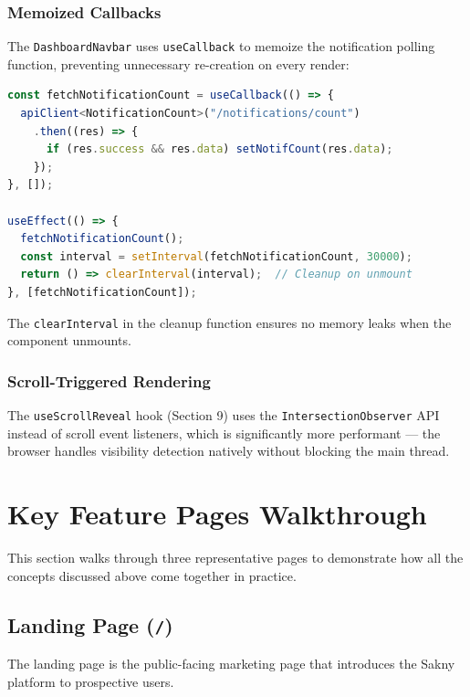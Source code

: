 \documentclass[12pt,a4paper]{article}
\begin{document}
\subsubsection{Memoized Callbacks}

The \texttt{DashboardNavbar} uses \texttt{useCallback} to memoize the notification polling function, preventing unnecessary re-creation on every render:

\begin{lstlisting}[language=TypeScript,title={Memoized polling with cleanup}]
const fetchNotificationCount = useCallback(() => {
  apiClient<NotificationCount>("/notifications/count")
    .then((res) => {
      if (res.success && res.data) setNotifCount(res.data);
    });
}, []);

useEffect(() => {
  fetchNotificationCount();
  const interval = setInterval(fetchNotificationCount, 30000);
  return () => clearInterval(interval);  // Cleanup on unmount
}, [fetchNotificationCount]);
\end{lstlisting}

The \texttt{clearInterval} in the cleanup function ensures no memory leaks when the component unmounts.

\subsubsection{Scroll-Triggered Rendering}

The \texttt{useScrollReveal} hook (Section 9) uses the \texttt{IntersectionObserver} API instead of scroll event listeners, which is significantly more performant — the browser handles visibility detection natively without blocking the main thread.

\section{Key Feature Pages Walkthrough}

This section walks through three representative pages to demonstrate how all the concepts discussed above come together in practice.

\subsection{Landing Page (\texttt{/})}

The landing page is the public-facing marketing page that introduces the Sakny platform to prospective users.
\end{document}
